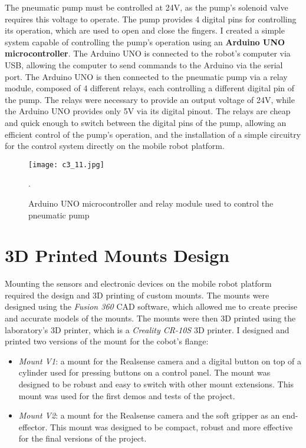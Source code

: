 The pneumatic pump must be controlled at 24V, as the pump's solenoid valve requires this voltage to operate.
The pump provides 4 digital pins for controlling its operation, which are used to open and close the fingers.
I created a simple system capable of controlling the pump's operation using an \textbf{Arduino UNO microcontroller}.
The Arduino UNO is connected to the robot's computer via USB, allowing the computer to send commands to the Arduino
via the serial port. The Arduino UNO is then connected to the pneumatic pump via a relay module,
composed of 4 different relays, each controlling a different digital pin of the pump. The relays were necessary
to provide an output voltage of 24V, while the Arduino UNO provides only 5V via its digital pinout.
The relays are cheap and quick enough to switch between the digital pins of the pump, allowing an efficient
control of the pump's operation, and the installation of a simple circuitry for the control system 
directly on the mobile robot platform.

\begin{figure}[t]
    \centering
    \texttt{[image: c3\_11.jpg]}
    \captionsetup{width=1\linewidth}
    \caption{Arduino UNO microcontroller and relay module used to control the pneumatic pump}.
    \label{fig:c3_img10}
\end{figure}

\section{3D Printed Mounts Design}

Mounting the sensors and electronic devices on the mobile robot platform required the design and 3D printing
of custom mounts. The mounts were designed using the \textit{Fusion 360} CAD software, which allowed me to create
precise and accurate models of the mounts. The mounts were then 3D printed using the laboratory's 3D printer,
which is a \textit{Creality CR-10S} 3D printer. I designed and printed two versions of the mount for the
cobot's flange:

\begin{itemize}
    \item \textit{Mount V1}: a mount for the Realsense camera and a digital button on top of a cylinder used
    for pressing buttons on a control panel. The mount was designed to be robust and easy to switch with other
    mount extensions. This mount was used for the first demos and tests of the project.
    \item \textit{Mount V2}: a mount for the Realsense camera and the soft gripper as an end-effector.
    This mount was designed to be compact, robust and more effective for the final versions of the project.
\end{itemize}

